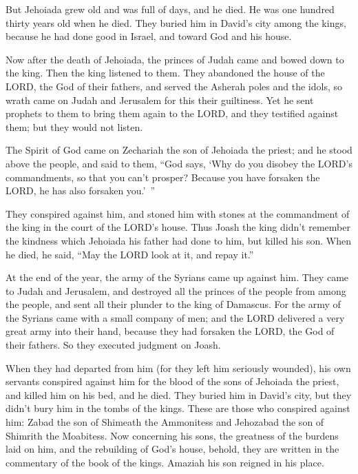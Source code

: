 \myverse{}But Jehoiada grew old and was full of days, and he died. He
was one hundred thirty years old when he died.
\myverse{}They buried him in David’s city among the kings, because he had done good
in Israel, and toward God and his house.

\myverse{}Now after the death of Jehoiada, the princes of Judah came and
bowed down to the king. Then the king listened to them.
\myverse{}They abandoned the house of the LORD, the God of their fathers, and served
the Asherah poles and the idols, so wrath came on Judah and Jerusalem for this their guiltiness.
\myverse{}Yet he sent prophets to them to bring them again to the LORD, and they testified
against them; but they would not listen.

\myverse{}The Spirit of God came on Zechariah the son of Jehoiada the
priest; and he stood above the people, and said to them, “God says, ‘Why do you disobey the LORD’s commandments,
so that you can’t prosper? Because you have forsaken the LORD, he has also forsaken you.’ ”

\myverse{}They conspired against him, and stoned him with stones at the
commandment of the king in the court of the LORD’s house.
\myverse{}Thus Joash the king didn’t remember the kindness which Jehoiada his father
had done to him, but killed his son. When he died, he said, “May the LORD look at it, and repay it.”

\myverse{}At the end of the year, the army of the Syrians came up against
him. They came to Judah and Jerusalem, and destroyed all the princes of the people from among the people,
and sent all their plunder to the king of Damascus.
\myverse{}For the army of the Syrians came with a small company of men; and the LORD
delivered a very great army into their hand, because they had forsaken the LORD, the God of their fathers.
So they executed judgment on Joash.

\myverse{}When they had departed from him (for they left him seriously
wounded), his own servants conspired against him for the blood of the sons of Jehoiada the priest, and
killed him on his bed, and he died. They buried him in David’s city, but they didn’t bury him in the tombs
of the kings.
\myverse{}These are those who conspired against him: Zabad the son of Shimeath the
Ammonitess and Jehozabad the son of Shimrith the Moabitess.
\myverse{}Now concerning his sons, the greatness of the burdens laid on him, and the
rebuilding of God’s house, behold, they are written in the commentary of the book of the kings. Amaziah
his son reigned in his place.



